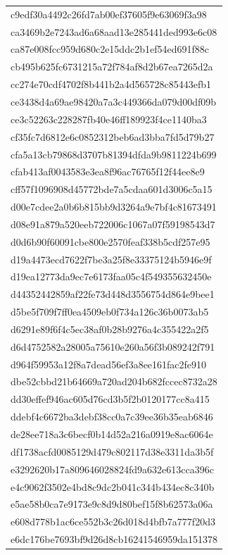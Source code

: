 \begin{tabular}{l}
c9edf30a4492c26fd7ab00ef37605f9e63069f3a98 \\
ca3469b2e7243ad6a68aad13e285441ded993e6c08 \\
ca87e008fcc959d680c2e15ddc2b1ef54ed691f88c \\
cb495b625fc6731215a72f784af8d2b67ea7265d2a \\
cc274e70cdf4702f8b441b2a4d565728c85443efb1 \\
ce3438d4a69ae98420a7a3c449366da079d00df09b \\
ce3c52263c228287fb40e46ff189923f4ce1140ba3 \\
cf35fc7d6812e6c0852312beb6ad3bba7fd5d79b27 \\
cfa5a13cb79868d3707b81394dfda9b9811224b699 \\
cfab413af0043583e3ea8f96ac76765f12f44ee8e9 \\
cff57f1096908d45772bde7a5cdaa601d3006c5a15 \\
d00e7cdee2a0b6b815bb9d3264a9e7bf4c81673491 \\
d08e91a879a520eeb722006c1067a07f59198543d7 \\
d0d6b90f60091cbe800e2570feaf338b5cdf257e95 \\
d19a4473ecd7622f7be3a25f8e33375124b5946e9f \\
d19ea12773da9ec7e6173faa05c4f549355632450e \\
d44352442859af22fe73d448d3556754d864e9bee1 \\
d5be5f709f7ff0ea4509eb0f734a126c36b0073ab5 \\
d6291e89f6f4c5ec38af0b28b9276a4c355422a2f5 \\
d6d4752582a28005a75610e260a56f3b089242f791 \\
d964f59953a12f8a7dead56ef3a8ee161fac2fe910 \\
dbe52cbbd21b64669a720ad204b682fccec8732a28 \\
dd30effef946ac605d76cd3b5f2b0120177cc8a415 \\
ddebf4c6672ba3debf38cc0a7c39ee36b35eab6846 \\
de28ee718a3c6becf0b14d52a216a0919e8ac6064e \\
df1738acfd0085129d479c802117d38e3311da3b5f \\
e3292620b17a809646028824fd9a632e613cca396c \\
e4c9062f3502e4bd8c9dc2b041c344b434ec8c340b \\
e5ae58b0ca7e9173e9c8d9d80bef15f8b62573a06a \\
e608d778b1ac6ce552b3c26d018d4bfb7a777f20d3 \\
e6dc176be7693bf9d26d8cb16241546959da151378 \\

\end{tabular}
